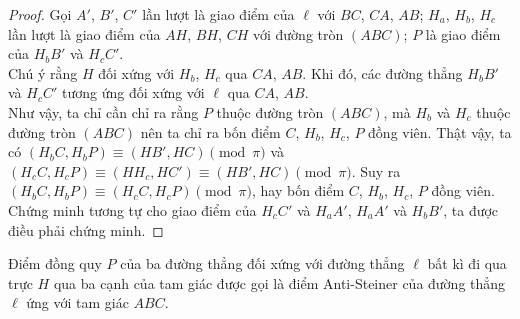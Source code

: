 \begin{center}
        \end{center}

        \begin{proof}
            Gọi \(A'\), \(B'\), \(C'\) lần lượt là giao điểm của \(\ell\) với \(BC\), \(CA\), \(AB\); \(H_a\), \(H_b\), \(H_c\) lần lượt là giao điểm của \(AH\), \(BH\), \(CH\) với đường tròn \((ABC)\); \(P\) là giao điểm của \(H_bB'\) và \(H_cC'\).\\
            Chú ý rằng \(H\) đối xứng với \(H_b\), \(H_c\) qua \(CA\), \(AB\). Khi đó, các đường thẳng \(H_bB'\) và \(H_cC'\) tương ứng đối xứng với \(\ell\) qua \(CA\), \(AB\).\\
            Như vậy, ta chỉ cần chỉ ra rằng \(P\) thuộc đường tròn \((ABC)\), mà \(H_b\) và \(H_c\) thuộc đường tròn \((ABC)\) nên ta chỉ ra bốn điểm \(C\), \(H_b\), \(H_c\), \(P\) đồng viên. Thật vậy, ta có \((H_bC,H_bP) \equiv (HB',HC) \pmod{\pi}\) và \((H_cC,H_cP) \equiv (HH_c,HC') \equiv (HB',HC) \pmod{\pi}\). Suy ra \((H_bC,H_bP) \equiv (H_cC,H_cP) \pmod{\pi}\), hay bốn điểm \(C\), \(H_b\), \(H_c\), \(P\) đồng viên.\\
            Chứng minh tương tự cho giao điểm của \(H_cC'\) và \(H_aA'\), \(H_aA'\) và \(H_bB'\), ta được điều phải chứng minh.
        \end{proof}

        \begin{definition}
            Điểm đồng quy \(P\) của ba đường thẳng đối xứng với đường thẳng \(\ell\) bất kì đi qua trực \(H\) qua ba cạnh của tam giác được gọi là điểm Anti-Steiner của đường thẳng \(\ell\) ứng với tam giác \(ABC\).
        \end{definition}

